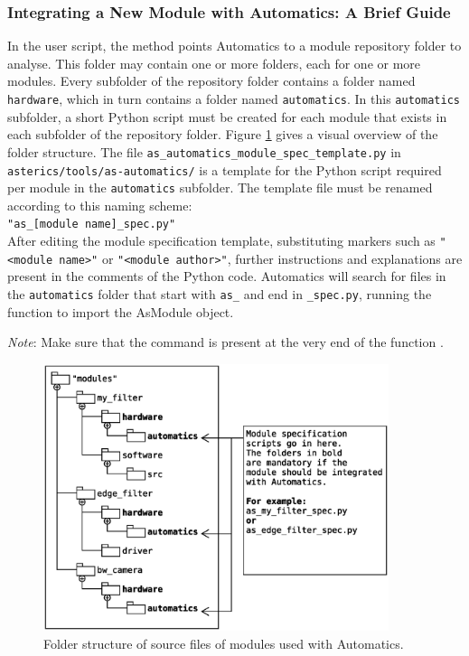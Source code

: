 \subsubsection{Integrating a New Module with Automatics: A Brief Guide}

In the user script, the method  points Automatics to a module repository folder to analyse.
This folder may contain one or more folders, each for one or more modules.
Every subfolder of the repository folder contains a folder named \texttt{hardware}, which in turn contains a folder named \texttt{automatics}.
In this \texttt{automatics} subfolder, a short Python script must be created for each module that exists in each subfolder of the repository folder.
Figure \ref{fig:06-02-module_folder_structure} gives a visual overview of the folder structure.
The file \texttt{as\_automatics\_module\_spec\_template.py} in \texttt{asterics/tools/as-automatics/} is a template for the Python script required per module in the \texttt{automatics} subfolder.
The template file must be renamed according to this naming scheme: \\
\texttt{"as\_[module name]\_spec.py"}\\
After editing the module specification template, substituting markers such as \texttt{"<module name>"} or \texttt{"<module author>"}, further instructions and explanations are present in the comments of the Python code.
Automatics will search for files in the \texttt{automatics} folder that start with \texttt{as\_} and end in \texttt{\_spec.py}, running the  function to import the AsModule object.

\emph{Note}: Make sure that the command  is present at the very end of the function .

\begin{figure}[!htb]
\centering
\includegraphics[width=0.9\textwidth]{./figs/06-02-Module_specification_folder_structure.eps}
\caption{Folder structure of source files of modules used with Automatics.}
\label{fig:06-02-module_folder_structure}
\end{figure}

